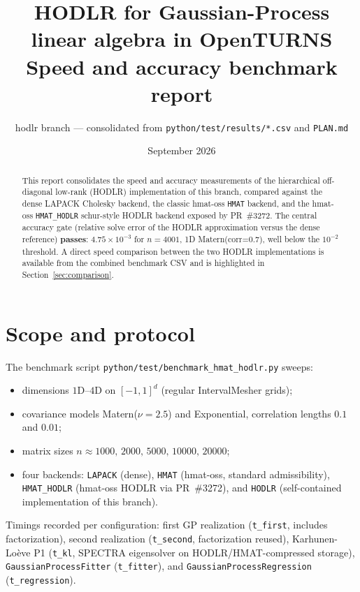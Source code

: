 \documentclass[11pt,a4paper]{article}
\title{\textbf{HODLR for Gaussian-Process linear algebra in OpenTURNS}\\ \large Speed and accuracy benchmark report}
\author{hodlr branch --- consolidated from \texttt{python/test/results/*.csv} and \texttt{PLAN.md}}
\date{September 2026}
\begin{document}
\maketitle
\begin{abstract}
This report consolidates the speed and accuracy measurements of the hierarchical
off-diagonal low-rank (HODLR) implementation of this branch, compared against
the dense LAPACK Cholesky backend, the classic hmat-oss \texttt{HMAT} backend, and
the hmat-oss \texttt{HMAT\_HODLR} schur-style HODLR backend exposed by PR~\#3272.
The central accuracy gate (relative solve error of the HODLR approximation versus
the dense reference) \textbf{passes}: $4.75\times10^{-3}$ for $n=4001$,
1D Matern(corr=0.7), well below the $10^{-2}$ threshold.  A direct
speed comparison between the two HODLR implementations is available from the
combined benchmark CSV and is highlighted in Section~\ref{sec:comparison}.
\end{abstract}
\tableofcontents

\section{Scope and protocol}
The benchmark script \texttt{python/test/benchmark\_hmat\_hodlr.py} sweeps:
\begin{itemize}
\item dimensions $1\text{D}$--$4\text{D}$ on $[-1,1]^{d}$ (regular IntervalMesher grids);
\item covariance models Matern($\nu=2.5$) and Exponential, correlation lengths
  $0.1$ and $0.01$;
\item matrix sizes $n\approx 1000,\,2000,\,5000,\,10000,\,20000$;
\item four backends: \texttt{LAPACK} (dense), \texttt{HMAT} (hmat-oss,
  standard admissibility), \texttt{HMAT\_HODLR} (hmat-oss HODLR via PR~\#3272),
  and \texttt{HODLR} (self-contained implementation of this branch).
\end{itemize}
Timings recorded per configuration: first GP realization (\texttt{t\_first},
includes factorization), second realization (\texttt{t\_second}, factorization
reused), Karhunen-Lo\`eve P1 (\texttt{t\_kl}, SPECTRA eigensolver on
HODLR/HMAT-compressed storage), \texttt{GaussianProcessFitter} (\texttt{t\_fitter}),
and \texttt{GaussianProcessRegression} (\texttt{t\_regression}).
\end{document}
